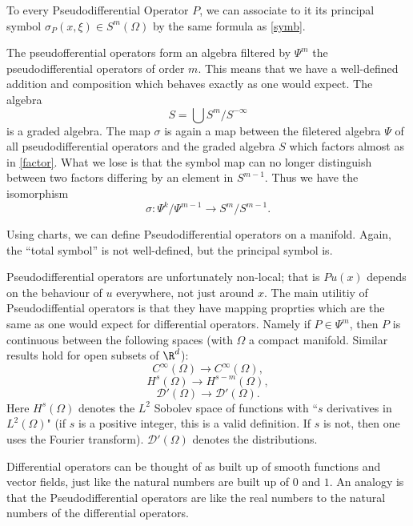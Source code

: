 \documentclass[12pt]{article}
\begin{document}
To every Pseudodifferential Operator $P$, we can associate to it its principal symbol $\sigma_P(x,\xi) \in S^m(\Omega)$ by the same formula as \ref{symb}. 

The pseudofferential operators form an algebra filtered by $\Psi^m$ the pseudodifferential operators of order $m$. This means that we have a well-defined addition and composition which behaves exactly as one would expect. The algebra
\[S = \bigcup S^{m}/S^{-\infty}\] is a graded algebra. The map $\sigma$ is again a map between the filetered algebra $\Psi$ of all pseudodifferential operators and the graded algebra $S$ which factors almost as in \ref{factor}. What we lose is that the symbol map can no longer distinguish between two factors differing by an element in $S^{m-1}$. Thus we have the isomorphism
\[\sigma:\Psi^k/\Psi^{m-1} \to S^m/S^{m-1}.\]

Using charts, we can define Pseudodifferential operators on a manifold. Again, the ``total symbol'' is not well-defined, but the principal symbol is.

Pseudodifferential operators are unfortunately non-local; that is $Pu(x)$ depends on the behaviour of $u$ everywhere, not just around $x$. The main utilitiy of Pseudodiffential operators is that they have mapping proprties which are the same as one would expect for differential operators. Namely if $P \in \Psi^m$, then $P$ is continuous between the following spaces (with $\Omega$ a compact manifold. Similar results hold for open subsets of $\R^d$):
\[C^\infty(\Omega) \to C^\infty(\Omega),\]
\[H^s(\Omega) \to H^{s-m}(\Omega),\]
\[\mathcal D'(\Omega) \to \mathcal D'(\Omega).\]
Here $H^s(\Omega)$ denotes the $L^2$ Sobolev space of functions with ``$s$ derivatives in $L^2(\Omega)$" (if $s$ is a positive integer, this is a valid definition. If $s$ is not, then one uses the Fourier transform). $\mathcal D'(\Omega)$ denotes the distributions.

Differential operators can be thought of as built up of smooth functions and vector fields, just like the natural numbers are built up of $0$ and $1$. An analogy is that the Pseudodifferential operators are like the real numbers to the natural numbers of the differential operators.
\end{document}

